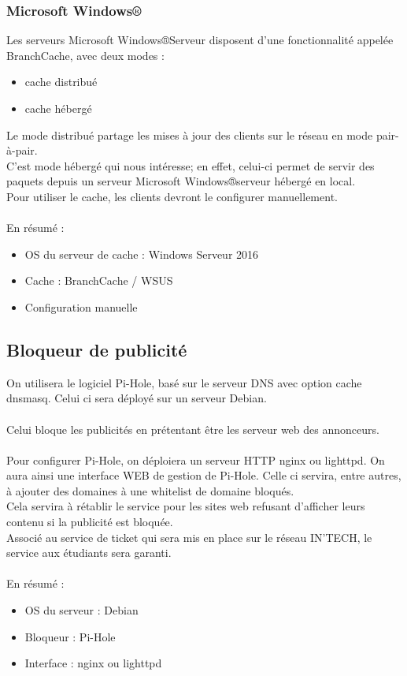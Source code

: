 \documentclass[14pt,a4paper]{extarticle}
\newcommand{\windaube}{Microsoft Windows®}
\begin{document}
\subsubsection{\windaube}
Les serveurs \windaube Serveur disposent d'une fonctionnalité appelée BranchCache, avec deux modes :
\begin{itemize}
    \item{cache distribué}
    \item{cache hébergé}
\end{itemize}
Le mode distribué partage les mises à jour des clients sur le réseau en mode pair-à-pair.\\
C'est mode hébergé qui nous intéresse; en effet, celui-ci permet de servir des paquets depuis un serveur \windaube serveur hébergé en local.\\
Pour utiliser le cache, les clients devront le configurer manuellement.\\\\
En résumé : 
\begin{itemize}
    \item{OS  du serveur de cache : Windows Serveur 2016}
    \item{Cache : BranchCache / WSUS}
    \item{Configuration manuelle}
\end{itemize}
\break
\subsection{Bloqueur de publicité}
On utilisera le logiciel Pi-Hole, basé sur le serveur DNS avec option cache dnsmasq.
Celui ci sera déployé sur un serveur Debian.\\\\
Celui bloque les publicités en prétentant être les serveur web des annonceurs.\\\\
Pour configurer Pi-Hole, on déploiera un serveur HTTP nginx ou lighttpd. On aura ainsi une interface WEB de gestion de Pi-Hole. Celle ci servira, entre autres, à ajouter des domaines à une whitelist de domaine bloqués.\\
Cela servira à rétablir le service pour les sites web refusant d'afficher leurs contenu si la publicité est bloquée.\\
Associé au service de ticket qui sera mis en place sur le réseau IN'TECH, le service aux étudiants sera garanti. \\\\
En résumé :
\begin{itemize}
    \item{OS du serveur : Debian}
    \item{Bloqueur : Pi-Hole}
    \item{Interface : nginx ou lighttpd}
\end{itemize}
\break
\end{document}
